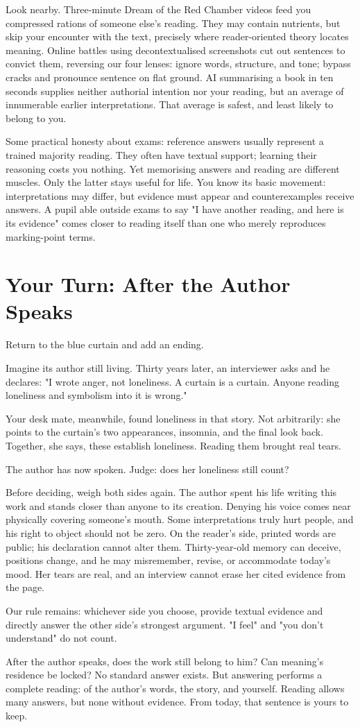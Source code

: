 Look nearby. Three-minute Dream of the Red Chamber videos feed you compressed rations of someone else's reading. They may contain nutrients, but skip your encounter with the text, precisely where reader-oriented theory locates meaning. Online battles using decontextualised screenshots cut out sentences to convict them, reversing our four lenses: ignore words, structure, and tone; bypass cracks and pronounce sentence on flat ground. AI summarising a book in ten seconds supplies neither authorial intention nor your reading, but an average of innumerable earlier interpretations. That average is safest, and least likely to belong to you.

Some practical honesty about exams: reference answers usually represent a trained majority reading. They often have textual support; learning their reasoning costs you nothing. Yet memorising answers and reading are different muscles. Only the latter stays useful for life. You know its basic movement: interpretations may differ, but evidence must appear and counterexamples receive answers. A pupil able outside exams to say "I have another reading, and here is its evidence" comes closer to reading itself than one who merely reproduces marking-point terms.

\section{Your Turn: After the Author Speaks}
Return to the blue curtain and add an ending.

Imagine its author still living. Thirty years later, an interviewer asks and he declares: "I wrote anger, not loneliness. A curtain is a curtain. Anyone reading loneliness and symbolism into it is wrong."

Your desk mate, meanwhile, found loneliness in that story. Not arbitrarily: she points to the curtain's two appearances, insomnia, and the final look back. Together, she says, these establish loneliness. Reading them brought real tears.

The author has now spoken. Judge: does her loneliness still count?

Before deciding, weigh both sides again. The author spent his life writing this work and stands closer than anyone to its creation. Denying his voice comes near physically covering someone's mouth. Some interpretations truly hurt people, and his right to object should not be zero. On the reader's side, printed words are public; his declaration cannot alter them. Thirty-year-old memory can deceive, positions change, and he may misremember, revise, or accommodate today's mood. Her tears are real, and an interview cannot erase her cited evidence from the page.

Our rule remains: whichever side you choose, provide textual evidence and directly answer the other side's strongest argument. "I feel" and "you don't understand" do not count.

After the author speaks, does the work still belong to him? Can meaning's residence be locked? No standard answer exists. But answering performs a complete reading: of the author's words, the story, and yourself. Reading allows many answers, but none without evidence. From today, that sentence is yours to keep.
